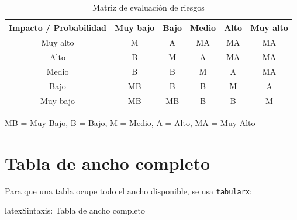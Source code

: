 \begin{table}[htbp]
  \centering
  \caption{Matriz de evaluación de riesgos}
  \label{tab:matriz-riesgos}
  \EPScabeceraTabla
  \begin{tabular}{c|ccccc}
    \toprule
    Impacto / Probabilidad & Muy bajo & Bajo & Medio & Alto & Muy alto \\
    \midrule
    Muy alto & \cellcolor{yellow!50}M & \cellcolor{orange!50}A & \cellcolor{red!50}MA & \cellcolor{red!70}MA & \cellcolor{red!90}MA \\
    Alto     & \cellcolor{green!50}B & \cellcolor{yellow!50}M & \cellcolor{orange!50}A & \cellcolor{red!50}MA & \cellcolor{red!70}MA \\
    Medio    & \cellcolor{green!50}B & \cellcolor{green!30}B & \cellcolor{yellow!50}M & \cellcolor{orange!50}A & \cellcolor{red!50}MA \\
    Bajo     & \cellcolor{green!70}MB & \cellcolor{green!50}B & \cellcolor{green!30}B & \cellcolor{yellow!50}M & \cellcolor{orange!50}A \\
    Muy bajo & \cellcolor{green!70}MB & \cellcolor{green!70}MB & \cellcolor{green!50}B & \cellcolor{green!30}B & \cellcolor{yellow!50}M \\
    \bottomrule
  \end{tabular}

  \medskip
  \footnotesize
  MB = Muy Bajo, B = Bajo, M = Medio, A = Alto, MA = Muy Alto
\end{table}

\section{Tabla de ancho completo}
\label{sec:tablas-ancho-completo}

Para que una tabla ocupe todo el ancho disponible, se usa \texttt{tabularx}:

\begin{codigosimple}{latex}{Sintaxis: Tabla de ancho completo}
\begin{tabularx}{\textwidth}{@{}lXcc@{}}
\end{tabularx}
\end{codigosimple}

